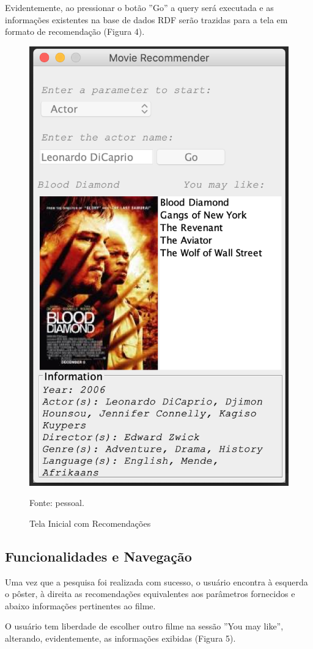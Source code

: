  Evidentemente, ao pressionar o botão ''Go'' a query será executada e as informações existentes na base de dados RDF serão trazidas para a tela em formato de recomendação (Figura 4).
 
   \begin{figure}[H]
 	\centering
 	\includegraphics[width=0.5\linewidth]{images/telaInicialRecomendacao}
 	\caption{Tela Inicial com Recomendações}
 	Fonte: pessoal.
 	\label{fig:Tela Inicial com Recomendações}
 \end{figure}


\subsection{Funcionalidades e Navegação} 
 
 Uma vez que a pesquisa foi realizada com sucesso, o usuário encontra à esquerda o pôster, à direita as recomendações equivalentes aos parâmetros fornecidos e abaixo informações pertinentes ao filme.
 
 O usuário tem liberdade de escolher outro filme na sessão ''You may like'', alterando, evidentemente, as informações exibidas (Figura 5).
 
